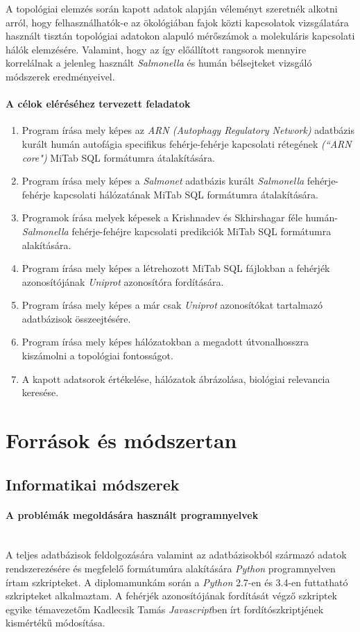 \documentclass[a4paper,12pt]{article}
\begin{document}
	A topológiai elemzés során kapott adatok alapján véleményt szeretnék alkotni arról, hogy felhasználhatók-e az ökológiában fajok közti kapcsolatok vizsgálatára használt tisztán topológiai adatokon alapuló mérőszámok a molekuláris kapcsolati hálók elemzésére. Valamint, hogy az így előállított rangsorok mennyire korrelálnak a jelenleg használt \textit{Salmonella} és humán bélsejteket vizsgáló módszerek eredményeivel.

	\paragraph{A célok eléréséhez tervezett feladatok}
	\begin{enumerate}
		\item Program írása mely képes az \textit{ARN (Autophagy Regulatory Network)} adatbázis kurált humán autofágia specifikus fehérje-fehérje kapcsolati rétegének \textit{(``ARN core")} MiTab SQL formátumra átalakítására.
		\item Program írása mely képes a \textit{Salmonet} adatbázis kurált \textit{Salmonella} fehérje-fehérje kapcsolati hálózatának MiTab SQL formátumra átalakítására.
		\item Programok írása melyek képesek a Krishnadev és Skhirshagar féle humán-\textit{Salmonella} fehérje-fehéjre kapcsolati predikciók MiTab SQL formátumra alakítására.
		\item Program írása mely képes a létrehozott MiTab SQL fájlokban a fehérjék azonosítójának \textit{Uniprot} azonosítóra fordítására.
		\item Program írása mely képes a már csak \textit{Uniprot} azonosítókat tartalmazó adatbázisok összeejtésére.
		\item Program írása mely képes hálózatokban a megadott útvonalhosszra kiszámolni a topológiai fontosságot.
		\item A kapott adatsorok értékelése, hálózatok ábrázolása, biológiai relevancia keresése.
	\end{enumerate}
	\pagebreak

\section{Források és módszertan}

	\subsection{Informatikai módszerek}
			\paragraph{A problémák megoldására használt programnyelvek} \mbox{}\\
			A teljes adatbázisok feldolgozására valamint az adatbázisokból származó adatok rendszerezésére és megfelelő formátumúra alakítására \textit{Python} programnyelven írtam szkripteket. A diplomamunkám során a \textit{Python} 2.7-en és 3.4-en futtatható szkripteket alkalmaztam. A fehérjék azonosítójának fordítását végző szkriptek egyike témavezetőm Kadlecsik Tamás \textit{Javascript}ben írt fordítószkriptjének kismértékű módosítása.
			
\end{document}
